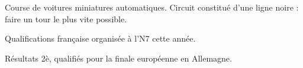 \begin{frame}
Course de voitures miniatures automatiques.
Circuit constitué d'une ligne noire : faire un tour le plus vite possible.

Qualifications française organisée à l'N7 cette année.

\begin{block}{Résultats}
    2è, qualifiés pour la finale européenne en Allemagne.
\end{block}

\end{frame}

